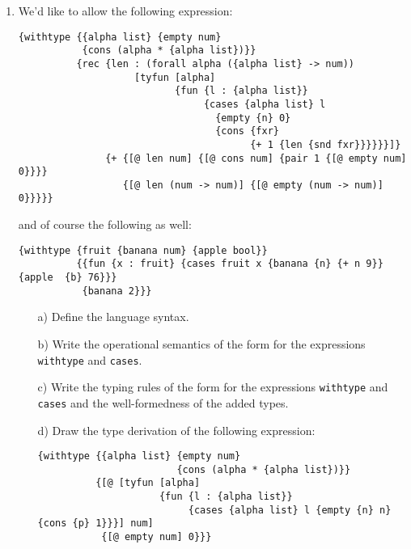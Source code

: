 \begin{enumerate}
\item We'd like to allow the following expression:

\begin{verbatim}
{withtype {{alpha list} {empty num}
           {cons (alpha * {alpha list})}}
          {rec {len : (forall alpha ({alpha list} -> num))
                    [tyfun [alpha]
                           {fun {l : {alpha list}}
                                {cases {alpha list} l
                                  {empty {n} 0}
                                  {cons {fxr}
                                        {+ 1 {len {snd fxr}}}}}}]}
               {+ {[@ len num] {[@ cons num] {pair 1 {[@ empty num] 0}}}}
                  {[@ len (num -> num)] {[@ empty (num -> num)] 0}}}}}
\end{verbatim}
and of course the following as well:
\begin{verbatim}
{withtype {fruit {banana num} {apple bool}}
          {{fun {x : fruit} {cases fruit x {banana {n} {+ n 9}} {apple  {b} 76}}}
           {banana 2}}}
\end{verbatim}

\begin{itemize}
  \item[a)] Define the language syntax.

  \item[b)] Write the operational semantics of the form  for the expressions
\texttt{withtype} and \texttt{cases}.

  \item[c)] Write the typing rules of the form  for the expressions
\texttt{withtype} and \texttt{cases} and the well-formedness of the added types.

  \item[d)] Draw the type derivation of the following expression:

\begin{verbatim}
{withtype {{alpha list} {empty num}
                        {cons (alpha * {alpha list})}}
          {[@ [tyfun [alpha]
                     {fun {l : {alpha list}}
                          {cases {alpha list} l {empty {n} n} {cons {p} 1}}}] num]
           {[@ empty num] 0}}}
\end{verbatim}
\end{itemize}


\end{enumerate}
